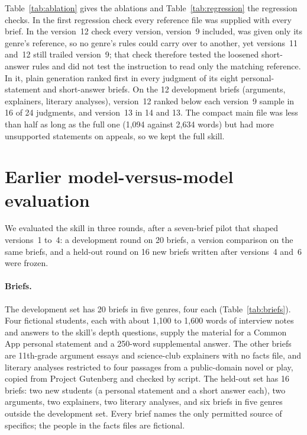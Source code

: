 \documentclass[11pt]{article}
\begin{document}
Table~\ref{tab:ablation} gives the ablations and Table~\ref{tab:regression} the regression checks. In the first regression check every reference file was supplied with every brief. In the version~12 check every version, version~9 included, was given only its genre's reference, so no genre's rules could carry over to another, yet versions~11 and~12 still trailed version~9; that check therefore tested the loosened short-answer rules and did not test the instruction to read only the matching reference. In it, plain generation ranked first in every judgment of its eight personal-statement and short-answer briefs. On the 12 development briefs (arguments, explainers, literary analyses), version~12 ranked below each version~9 sample in 16 of 24 judgments, and version~13 in 14 and 13. The compact main file was less than half as long as the full one (1,094 against 2,634 words) but had more unsupported statements on appeals, so we kept the full skill.

\FloatBarrier
\section{Earlier model-versus-model evaluation}
\label{sec:appendix-rank}

We evaluated the skill in three rounds, after a seven-brief pilot that shaped versions~1 to~4: a development round on 20 briefs, a version comparison on the same briefs, and a held-out round on 16 new briefs written after versions~4 and~6 were frozen.

\paragraph{Briefs.} The development set has 20 briefs in five genres, four each (Table~\ref{tab:briefs}). Four fictional students, each with about 1,100 to 1,600 words of interview notes and answers to the skill's depth questions, supply the material for a Common App personal statement and a 250-word supplemental answer. The other briefs are 11th-grade argument essays and science-club explainers with no facts file, and literary analyses restricted to four passages from a public-domain novel or play, copied from Project Gutenberg and checked by script. The held-out set has 16 briefs: two new students (a personal statement and a short answer each), two arguments, two explainers, two literary analyses, and six briefs in five genres outside the development set. Every brief names the only permitted source of specifics; the people in the facts files are fictional.
\end{document}
